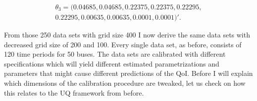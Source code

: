 \begin{equation*}
	\begin{split}
		\theta_3 = (
		0.04685, 0.04685, 0.22375, 0.22375, 0.22295, \\
		0.22295, 0.00635, 0.00635, 0.0001, 0.0001)'.
	\end{split}
\end{equation*}

From those 250 data sets with grid size 400 I now derive the same data sets with decreased grid size of 200 and 100. Every single data set, as before, consists of 120 time periods for 50 buses. The data sets are calibrated with different specifications which will yield different estimated parametrizations and parameters that might cause different predictions of the QoI. Before I will explain which dimensions of the calibration procedure are tweaked, let us check on how this relates to the UQ framework from before.

